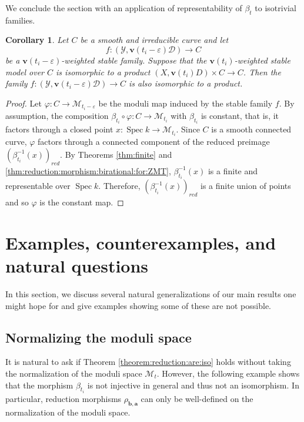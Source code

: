 \documentclass[11pt]{amsart}
\newtheorem{cor}[theorem]{Corollary}
\theoremstyle{definition}
\theoremstyle{remark}
\newcommand{\calY}{\mathcal Y}
\newcommand{\calD}{\mathcal D}
\newcommand{\sM}{\mathscr{M}}
\newcommand{\Spec}{\operatorname{Spec}}
\newcommand{\bfa}{\mathbf{a}}
\newcommand{\bfv}{\mathbf{v}}
\newcommand{\bfb}{\mathbf{b}}
\begin{document}
	We conclude the section with an application of representability of $\beta_t$ to isotrivial families.
	
	\begin{cor} Let $C$ be a smooth and irreducible curve and let $$f : (\calY, \bfv(t_i - \varepsilon)\calD) \to C$$ be a $\bfv(t_i - \varepsilon)$-weighted stable family. Suppose that the $\bfv(t_i)$-weighted stable model over $C$ is isomorphic to a product $(X, \bfv(t_i)D) \times C \to C$. Then the family $f : (\calY, \bfv(t_i - \varepsilon)\calD) \to C$ is also isomorphic to a product.
	\end{cor}
	\begin{proof} Let $\varphi : C \to \sM_{t_i- \varepsilon}$ be the moduli map induced by the stable family $f$. By assumption, the composition $\beta_{t_i} \circ \varphi : C \to \sM_{t_i}$ with $\beta_{t_i}$ is constant, that is, it factors through a closed point $x : \Spec k \to \sM_{t_i}$. Since $C$ is a smooth connected curve, $\varphi$ factors through a connected component of the reduced preimage $(\beta_{t_i}^{-1}(x))_{red}$. By Theorems \ref{thm:finite} and \ref{thm:reduction:morphism:birational:for:ZMT}, $\beta_{t_i}^{-1}(x)$ is a finite and representable over $\Spec k$. Therefore, $(\beta_{t_i}^{-1}(x))_{red}$ is a finite union of points and so $\varphi$ is the constant map. \end{proof}
	
	\section{Examples, counterexamples, and natural questions}\label{section:countereg}
	
	In this section, we discuss several natural generalizations of our main results one might hope for and give examples showing some of these are not possible. 
	
	\subsection{Normalizing the moduli space}\label{sec:normalization} It is natural to ask if Theorem \ref{theorem:reduction:are:iso} holds without taking the normalization of the moduli space $\sM_t$. However, the following example shows that the morphism $\beta_{t_i}$ is not injective in general and thus not an isomorphism. In particular, reduction morphisms $\rho_{\bfb, \bfa}$ can only be well-defined on the normalization of the moduli space. 
	
\end{document}
